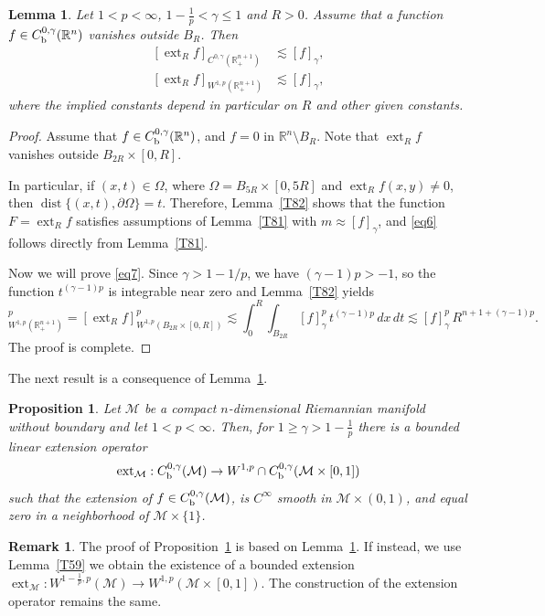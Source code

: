 \documentclass[intlimits,12pt,reqno]{amsart}
\newcommand{\cM}{\mathcal M}
\newcommand{\bbbr}{\mathbb R}
\newcommand{\R}{\mathbb R}
\numberwithin{equation}{section}
\def\dist{\operatorname{dist}}
\def\ext{\operatorname{ext}}
\newtheorem{lemma}[theorem]{Lemma}
\newtheorem{proposition}[theorem]{Proposition}
\theoremstyle{definition}
\newtheorem{remark}[theorem]{Remark}
\begin{document}
\begin{lemma}
\label{T5}
Let $1<p<\infty$, $1-\frac{1}{p}<\gamma\leq 1$ and $R>0$. Assume that a function $f\in C_{\rm b}^{0,\gamma}(\R^n)$ vanishes outside $B_R$. Then
\begin{align}
\label{eq6}
[\ext_R f]_{C^{0,\gamma}(\R^{n+1}_+)}
&\lesssim [f]_{\gamma},\\
\label{eq7}
[\ext_R f]_{W^{1,p}(\bbbr^{n+1}_+)}
&\lesssim [f]_{\gamma},
\end{align}
where the implied constants depend in particular on $R$ and other given constants.
\end{lemma}
\begin{proof}
Assume that $f\in C_{\rm b}^{0,\gamma}(\R^n)$, and $f=0$ in $\R^n\setminus B_R$.
Note that $\ext_R f$ vanishes outside $B_{2R}\times [0,R]$.

In particular, if $(x,t)\in\Omega$, where $\Omega=B_{5R}\times[0,5R]$ and 
$\ext_R f(x,y)\neq 0$, then $\dist\{(x,t),\partial\Omega\}=t$.
Therefore, Lemma~\ref{T82} shows that the function $F=\ext_R f$ satisfies assumptions of Lemma~\ref{T81} with 
$m\approx [f]_{\gamma}$, and \eqref{eq6} follows directly from Lemma~\ref{T81}.

Now we will prove \eqref{eq7}.
Since $\gamma>1-1/p$, we have
$(\gamma-1)p>-1$, so the function $t^{(\gamma-1)p}$ is integrable near zero and
Lemma~\ref{T82} yields
\begin{equation*}
[\ext_Rf]^p_{W^{1,p}(\R^{n+1}_+)}
=
[\ext_Rf]^p_{W^{1,p}(B_{2R}\times [0,R])}
\lesssim 
\int_0^R\int_{B_{2R}}[f]_{\gamma}^p\, t^{(\gamma-1)p}\, dx\, dt
\lesssim
[f]^p_{\gamma}\,R^{n+1+(\gamma-1)p}.
\end{equation*}
The proof is complete.
\end{proof}
The next result is a consequence of Lemma~\ref{T5}.
\begin{proposition}
\label{T6}
Let $\cM$ be a compact $n$-dimensional Riemannian manifold without boundary and let $1<p<\infty$.
Then, for $1\geq \gamma> 1-\frac{1}{p}$ there is a bounded linear extension operator
$$
\ext_{\cM}: C_{\rm b}^{0,\gamma}(\cM)\to W^{1,p}\cap C_{\rm b}^{0,\gamma}(\cM\times [0,1])
$$
such that the extension of $f\in C_{\rm b}^{0,\gamma}(\cM)$, is $C^\infty$ smooth in $\cM\times (0,1)$, and equal zero in a neighborhood of $\cM\times\{ 1\}$. 
\end{proposition}
\begin{remark}
\label{R5}
The proof of Proposition~\ref{T6} is based on Lemma~\ref{T5}. If instead, we use Lemma~\ref{T59} we obtain the existence of a bounded extension $\ext_{\cM}:W^{1-\frac{1}{p},p}(\cM)\to W^{1,p}(\cM\times [0,1])$. The construction of the extension operator remains the same.
\end{remark}
\end{document}
